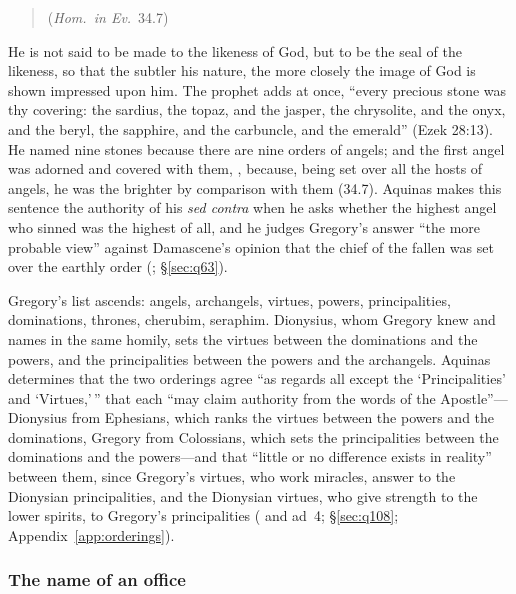 \begin{quote}
 (\emph{Hom.\ in Ev.}\ 34.7)
\end{quote}

\noindent He is not said to be made to the likeness of God, but to be the
seal of the likeness, so that the subtler his nature, the more closely the
image of God is shown impressed upon him. The prophet adds at once, ``every
precious stone was thy covering: the sardius, the topaz, and the jasper, the
chrysolite, and the onyx, and the beryl, the sapphire, and the carbuncle, and
the emerald'' (Ezek 28:13).  He named nine stones because there
are nine orders of angels; and the first angel was adorned and covered with
them, , because, being set over all the hosts of angels,
he was the brighter by comparison with them (34.7). Aquinas makes this
sentence the authority of his \emph{sed contra} when he asks whether the
highest angel who sinned was the highest of all, and he judges Gregory's
answer ``the more probable view'' against Damascene's opinion that the chief
of the fallen was set over the earthly order (; \S\ref{sec:q63}).

Gregory's list ascends: angels, archangels, virtues, powers, principalities,
dominations, thrones, cherubim, seraphim. Dionysius, whom Gregory knew and
names in the same homily, sets the virtues between the dominations and the
powers, and the principalities between the powers and the archangels.
Aquinas determines that the two orderings agree ``as regards all except the
`Principalities' and `Virtues,'\,'' that each ``may claim authority from the
words of the Apostle''---Dionysius from Ephesians, which ranks the virtues
between the powers and the dominations, Gregory from Colossians, which sets
the principalities between the dominations and the powers---and that ``little
or no difference exists in reality'' between them, since Gregory's virtues,
who work miracles, answer to the Dionysian principalities, and the
Dionysian virtues, who give strength to the lower spirits, to Gregory's
principalities ( and ad~4; \S\ref{sec:q108};
Appendix~\ref{app:orderings}).

\subsubsection{The name of an office}

